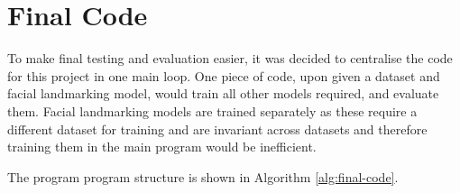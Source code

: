 \section{Final Code}


To make final testing and evaluation easier, it was decided to centralise the code for this project in one main loop. One piece of code, upon given a dataset and facial landmarking model, would train all other models required, and evaluate them. Facial landmarking models are trained separately as these require a different dataset for training and are invariant across datasets and therefore training them in the main program would be inefficient.

The program program structure is shown in Algorithm \ref{alg:final-code}.

